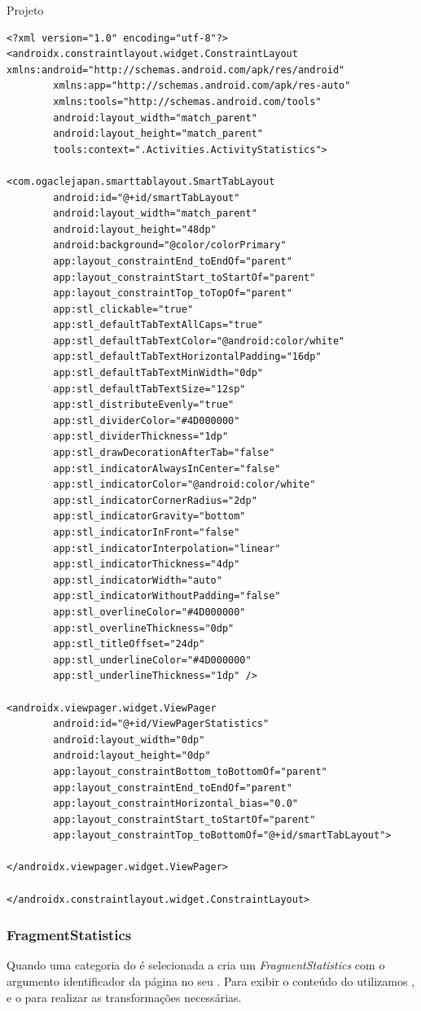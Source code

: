 \documentclass[
	12pt,				%
	openright,			%
	twoside,			%
	a4paper,			%
	english,			%
	french,				%
	spanish,			%
	brazil				%
	]{abntex2}
\begin{document}
\begin{chapter}{Projeto}
\begin{lstlisting}[numbers=none,basicstyle=\small,
caption={ActivityStatistics.xml},
title={ActivityStatistics.xml},
label={ActivityStatistics.xml}]
<?xml version="1.0" encoding="utf-8"?>
<androidx.constraintlayout.widget.ConstraintLayout xmlns:android="http://schemas.android.com/apk/res/android"
		xmlns:app="http://schemas.android.com/apk/res-auto"
		xmlns:tools="http://schemas.android.com/tools"
		android:layout_width="match_parent"
		android:layout_height="match_parent"
		tools:context=".Activities.ActivityStatistics">

<com.ogaclejapan.smarttablayout.SmartTabLayout
		android:id="@+id/smartTabLayout"
		android:layout_width="match_parent"
		android:layout_height="48dp"
		android:background="@color/colorPrimary"
		app:layout_constraintEnd_toEndOf="parent"
		app:layout_constraintStart_toStartOf="parent"
		app:layout_constraintTop_toTopOf="parent"
		app:stl_clickable="true"
		app:stl_defaultTabTextAllCaps="true"
		app:stl_defaultTabTextColor="@android:color/white"
		app:stl_defaultTabTextHorizontalPadding="16dp"
		app:stl_defaultTabTextMinWidth="0dp"
		app:stl_defaultTabTextSize="12sp"
		app:stl_distributeEvenly="true"
		app:stl_dividerColor="#4D000000"
		app:stl_dividerThickness="1dp"
		app:stl_drawDecorationAfterTab="false"
		app:stl_indicatorAlwaysInCenter="false"
		app:stl_indicatorColor="@android:color/white"
		app:stl_indicatorCornerRadius="2dp"
		app:stl_indicatorGravity="bottom"
		app:stl_indicatorInFront="false"
		app:stl_indicatorInterpolation="linear"
		app:stl_indicatorThickness="4dp"
		app:stl_indicatorWidth="auto"
		app:stl_indicatorWithoutPadding="false"
		app:stl_overlineColor="#4D000000"
		app:stl_overlineThickness="0dp"
		app:stl_titleOffset="24dp"
		app:stl_underlineColor="#4D000000"
		app:stl_underlineThickness="1dp" />

<androidx.viewpager.widget.ViewPager
		android:id="@+id/ViewPagerStatistics"
		android:layout_width="0dp"
		android:layout_height="0dp"
		app:layout_constraintBottom_toBottomOf="parent"
		app:layout_constraintEnd_toEndOf="parent"
		app:layout_constraintHorizontal_bias="0.0"
		app:layout_constraintStart_toStartOf="parent"
		app:layout_constraintTop_toBottomOf="@+id/smartTabLayout">

</androidx.viewpager.widget.ViewPager>

</androidx.constraintlayout.widget.ConstraintLayout>
\end{lstlisting}

\newpage
\subsubsection{FragmentStatistics} \label{FragmentStatistics}
Quando uma categoria do  é selecionada a  cria um \textit{FragmentStatistics} com o argumento identificador da página no seu .
Para exibir o conteúdo do  utilizamos ,  e o  para realizar as transformações necessárias.
  


\end{chapter}
\end{document}
